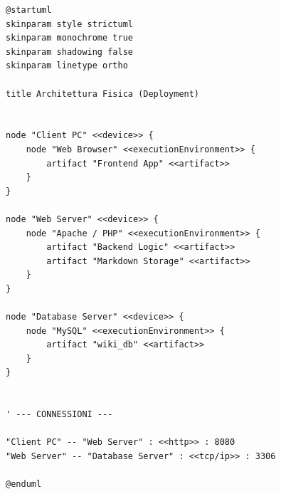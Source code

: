 \begin{verbatim}
@startuml
skinparam style strictuml
skinparam monochrome true
skinparam shadowing false
skinparam linetype ortho

title Architettura Fisica (Deployment)


node "Client PC" <<device>> {
    node "Web Browser" <<executionEnvironment>> {
        artifact "Frontend App" <<artifact>>
    }
}

node "Web Server" <<device>> {
    node "Apache / PHP" <<executionEnvironment>> {
        artifact "Backend Logic" <<artifact>>
        artifact "Markdown Storage" <<artifact>>
    }
}

node "Database Server" <<device>> {
    node "MySQL" <<executionEnvironment>> {
        artifact "wiki_db" <<artifact>>
    }
}


' --- CONNESSIONI ---

"Client PC" -- "Web Server" : <<http>> : 8080
"Web Server" -- "Database Server" : <<tcp/ip>> : 3306

@enduml
\end{verbatim}